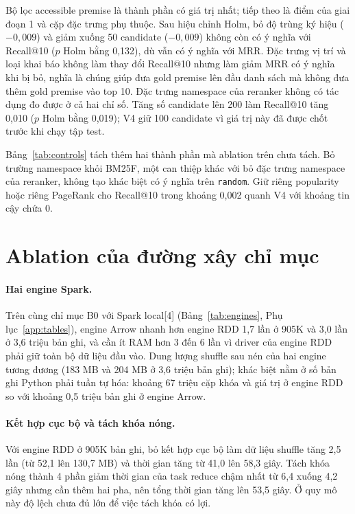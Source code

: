 \documentclass[11pt,a4paper,oneside]{report}
\newcommand{\code}[1]{\texttt{#1}}
\begin{document}
Bộ lọc accessible premise là thành phần có giá trị nhất; tiếp theo là điểm của giai đoạn 1 và cặp đặc trưng phụ thuộc. Sau
hiệu chỉnh Holm, bỏ độ trùng ký hiệu ($-0{,}009$) và giảm xuống 50 candidate ($-0{,}009$) không còn có ý nghĩa với
Recall@10 ($p$ Holm bằng 0,132), dù vẫn có ý nghĩa với MRR. Đặc trưng vị trí và loại khai báo không làm thay đổi Recall@10
nhưng làm giảm MRR có ý nghĩa khi bị bỏ, nghĩa là chúng giúp đưa gold premise lên đầu danh sách mà không đưa thêm gold
premise vào top 10. Đặc trưng namespace của reranker không có tác dụng đo được ở cả hai chỉ số. Tăng số candidate lên 200 làm
Recall@10 tăng 0,010 ($p$ Holm bằng 0,019); V4 giữ 100 candidate vì giá trị này đã được chốt trước khi chạy tập test.

Bảng~\ref{tab:controls} tách thêm hai thành phần mà ablation trên chưa tách. Bỏ trường namespace khỏi BM25F, một can thiệp
khác với bỏ đặc trưng namespace của reranker, không tạo khác biệt có ý nghĩa trên \code{random}. Giữ riêng popularity hoặc
riêng PageRank cho Recall@10 trong khoảng 0,002 quanh V4 với khoảng tin cậy chứa 0.

\FloatBarrier

\section{Ablation của đường xây chỉ mục}

\paragraph{Hai engine Spark.}\label{sec:engines} Trên cùng chỉ mục B0 với Spark local[4] (Bảng~\ref{tab:engines}, Phụ
lục~\ref{app:tables}), engine Arrow nhanh hơn engine RDD 1,7 lần ở 905K và 3,0 lần ở 3,6 triệu bản ghi, và cần ít RAM hơn
3 đến 6 lần vì driver của engine RDD phải giữ toàn bộ dữ liệu đầu vào. Dung lượng shuffle sau nén của hai engine tương
đương (183 MB và 204 MB ở 3,6 triệu bản ghi); khác biệt nằm ở số bản ghi Python phải tuần tự hóa: khoảng 67 triệu cặp
khóa và giá trị ở engine RDD so với khoảng 0,5 triệu bản ghi ở engine Arrow.

\paragraph{Kết hợp cục bộ và tách khóa nóng.} Với engine RDD ở 905K bản ghi, bỏ kết hợp cục bộ làm dữ liệu shuffle tăng
2,5 lần (từ 52,1 lên 130,7 MB) và thời gian tăng từ 41,0 lên 58,3 giây. Tách khóa nóng thành 4 phần giảm thời gian của task
reduce chậm nhất từ 6,4 xuống 4,2 giây nhưng cần thêm hai pha, nên tổng thời gian tăng lên 53,5 giây. Ở quy mô này độ lệch
chưa đủ lớn để việc tách khóa có lợi.
\end{document}
